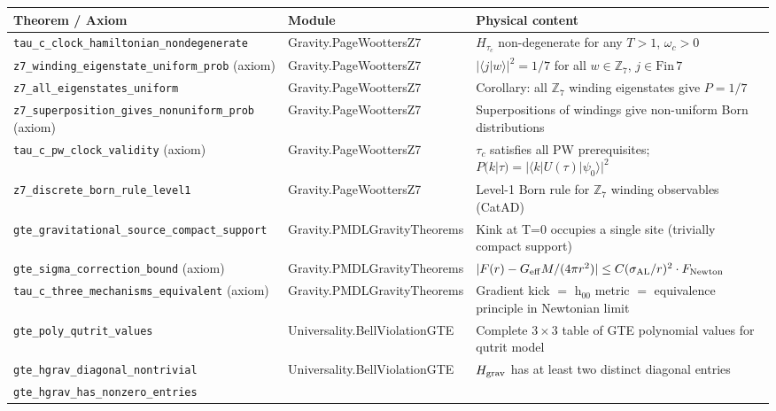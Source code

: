 \documentclass[11pt,a4paper]{article}
\theoremstyle{definition}
\begin{document}
\begin{table}[h]
\centering\footnotesize
\setlength{\tabcolsep}{4pt}
\begin{tabular}{@{}p{5.2cm}p{4.4cm}p{4.4cm}@{}}
\toprule
Theorem / Axiom & Module & Physical content \\
\midrule
\texttt{tau\_c\_clock\_hamiltonian\_\allowbreak nondegenerate}
  & Gravity.PageWoottersZ7
  & $H_{\tau_c}$ non-degenerate for any $T{>}1$, $\omega_c{>}0$ \\[1pt]
\texttt{z7\_winding\_eigenstate\_\allowbreak uniform\_prob} (axiom)
  & Gravity.PageWoottersZ7
  & $|\langle j | w \rangle|^2 = 1/7$ for all $w \in \mathbb{Z}_7$, $j \in \mathrm{Fin}\,7$ \\[1pt]
\texttt{z7\_all\_eigenstates\_uniform}
  & Gravity.PageWoottersZ7
  & Corollary: all $\mathbb{Z}_7$ winding eigenstates give $P=1/7$ \\[1pt]
\texttt{z7\_superposition\_gives\_\allowbreak nonuniform\_prob} (axiom)
  & Gravity.PageWoottersZ7
  & Superpositions of windings give non-uniform Born distributions \\[1pt]
\texttt{tau\_c\_pw\_clock\_validity} (axiom)
  & Gravity.PageWoottersZ7
  & $\tau_c$ satisfies all PW prerequisites; $P(k|\tau)=|\langle k|U(\tau)|\psi_0\rangle|^2$ \\[1pt]
\texttt{z7\_discrete\_born\_rule\_level1}
  & Gravity.PageWoottersZ7
  & Level-1 Born rule for $\mathbb{Z}_7$ winding observables (CatAD) \\[1pt]
\texttt{gte\_gravitational\_source\_\allowbreak compact\_support}
  & Gravity.PMDLGravityTheorems
  & Kink at T=0 occupies a single site (trivially compact support) \\[1pt]
\texttt{gte\_sigma\_correction\_bound} (axiom)
  & Gravity.PMDLGravityTheorems
  & $|F(r) - G_{\rm eff}M/(4\pi r^2)| \leq C(\sigma_{\rm AL}/r)^2 \cdot F_{\rm Newton}$ \\[1pt]
\texttt{tau\_c\_three\_mechanisms\_\allowbreak equivalent} (axiom)
  & Gravity.PMDLGravityTheorems
  & Gradient kick $=$ h$_{00}$ metric $=$ equivalence principle in Newtonian limit \\[1pt]
\texttt{gte\_poly\_qutrit\_values}
  & Universality.BellViolationGTE
  & Complete $3\times 3$ table of GTE polynomial values for qutrit model \\[1pt]
\texttt{gte\_hgrav\_diagonal\_nontrivial}
  & Universality.BellViolationGTE
  & $H_{\rm grav}$ has at least two distinct diagonal entries \\[1pt]
\texttt{gte\_hgrav\_has\_nonzero\_entries}

\end{tabular}
\end{table}
\end{document}
